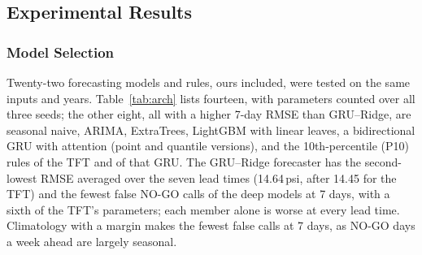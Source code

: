 \documentclass[conference]{IEEEtran}
\begin{document}
\subsection{Experimental Results}
\subsubsection{Model Selection}
Twenty-two forecasting models and rules, ours included, were tested on the same inputs and years.
Table~\ref{tab:arch} lists fourteen, with parameters counted over all three seeds; the other
eight, all with a higher 7-day RMSE than GRU--Ridge, are seasonal naive, ARIMA, ExtraTrees,
LightGBM with linear leaves, a bidirectional GRU with attention (point and quantile versions),
and the 10th-percentile (P10) rules of the TFT and of that GRU. The GRU--Ridge forecaster has the second-lowest RMSE averaged over the
seven lead times (14.64\,psi, after 14.45 for the TFT) and the fewest false NO-GO calls of the
deep models at 7 days, with a sixth of the TFT's parameters; each member alone is worse at every
lead time. Climatology with a margin makes the fewest false calls at 7 days, as NO-GO days a week
ahead are largely seasonal.
\end{document}
